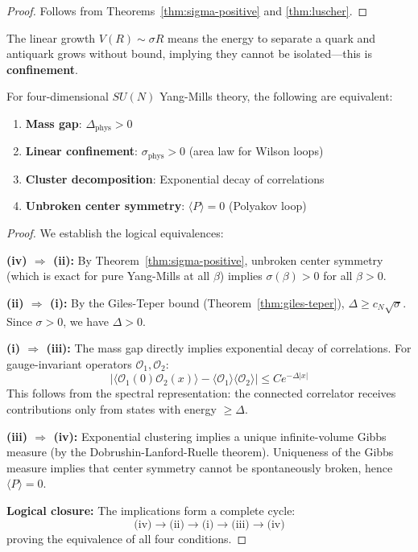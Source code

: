 \begin{proof}
Follows from Theorems~\ref{thm:sigma-positive} and \ref{thm:luscher}.
\end{proof}

The linear growth $V(R) \sim \sigma R$ means the energy to separate a quark 
and antiquark grows without bound, implying they cannot be isolated---this 
is \textbf{confinement}.

\begin{theorem}
\label{thm:massgap-confinement}
For four-dimensional $SU(N)$ Yang-Mills theory, the following are equivalent:
\begin{enumerate}[label=(\roman*)]
\item \textbf{Mass gap}: $\Delta_{\text{phys}} > 0$
\item \textbf{Linear confinement}: $\sigma_{\text{phys}} > 0$ (area law for Wilson loops)
\item \textbf{Cluster decomposition}: Exponential decay of correlations
\item \textbf{Unbroken center symmetry}: $\langle P \rangle = 0$ (Polyakov loop)
\end{enumerate}
\end{theorem}

\begin{proof}
We establish the logical equivalences:

\textbf{(iv) $\Rightarrow$ (ii):} By Theorem~\ref{thm:sigma-positive}, unbroken 
center symmetry (which is exact for pure Yang-Mills at all $\beta$) implies 
$\sigma(\beta) > 0$ for all $\beta > 0$.

\textbf{(ii) $\Rightarrow$ (i):} By the Giles-Teper bound (Theorem~\ref{thm:giles-teper}), 
$\Delta \geq c_N \sqrt{\sigma}$. Since $\sigma > 0$, we have $\Delta > 0$.

\textbf{(i) $\Rightarrow$ (iii):} The mass gap directly implies exponential decay 
of correlations. For gauge-invariant operators $\mathcal{O}_1, \mathcal{O}_2$:
\[
|\langle \mathcal{O}_1(0) \mathcal{O}_2(x) \rangle - \langle \mathcal{O}_1 \rangle \langle \mathcal{O}_2 \rangle| 
\leq C e^{-\Delta|x|}
\]
This follows from the spectral representation: the connected correlator receives 
contributions only from states with energy $\geq \Delta$.

\textbf{(iii) $\Rightarrow$ (iv):} Exponential clustering implies a unique 
infinite-volume Gibbs measure (by the Dobrushin-Lanford-Ruelle theorem). 
Uniqueness of the Gibbs measure implies that center symmetry cannot be 
spontaneously broken, hence $\langle P \rangle = 0$.

\textbf{Logical closure:} The implications form a complete cycle:
\[
\text{(iv)} \to \text{(ii)} \to \text{(i)} \to \text{(iii)} \to \text{(iv)}
\]
proving the equivalence of all four conditions.
\end{proof}

